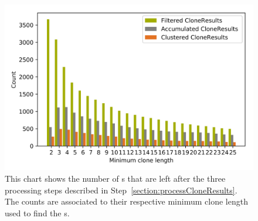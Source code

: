 
\begin{figure}
	\centering
	\includegraphics[width=0.8\linewidth]{figures/Thresholds/processed.png}
	\caption[Processed CloneClasses in relation to the minimum clone length]{This chart shows the number of s that are left after the three processing steps described in Step~\ref{section:processCloneResults}. The counts are associated to their respective minimum clone length used to find the s.}
	\label{fig:thresholdsProcessed}
\end{figure}

